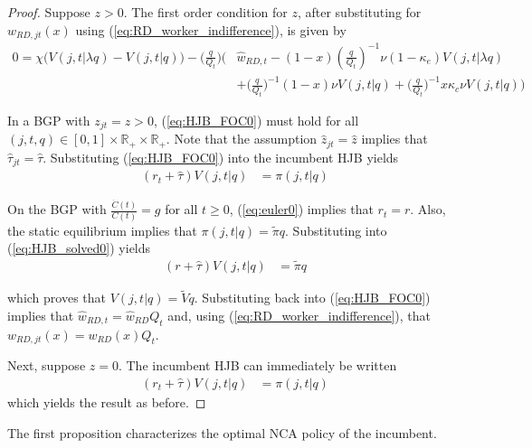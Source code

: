 \documentclass[11pt,english]{article}
\begin{document}
\begin{proof}
	Suppose $z > 0$. The first order condition for $z$, after substituting for $w_{RD,jt}(x)$ using (\ref{eq:RD_worker_indifference}), is given by 
	\begin{align}
	0 = \chi \big( V(j,t|\lambda q) - V(j,t|q)\big) - \big(\frac{q}{Q_t}\big) \Bigg( &\hat{w}_{RD,t} - (1-x) (\frac{q}{Q_t})^{-1} \nu (1-\kappa_e) V(j,t|\lambda q) \nonumber \\
	&+ \big(\frac{q}{Q_t}\big)^{-1} (1-x) \nu V(j,t|q) + \big(\frac{q}{Q_t}\big)^{-1}  x \kappa_c \nu V(j,t|q) \Bigg) \label{eq:HJB_FOC0}
	\end{align}
	
	In a BGP with $z_{jt} = z > 0$, (\ref{eq:HJB_FOC0}) must hold for all $(j,t,q) \in [0,1] \times \mathbb{R}_+ \times \mathbb{R}_+$. Note that the assumption $\hat{z}_{jt} = \hat{z}$ implies that $\hat{\tau}_{jt} = \hat{\tau}$. Substituting (\ref{eq:HJB_FOC0}) into the incumbent HJB yields
	\begin{align}
	(r_t + \hat{\tau}) V(j,t|q) &= \pi(j,t|q) \label{eq:HJB_solved0}
	\end{align}
	
	On the BGP with $\frac{\dot{C}(t)}{C(t)} = g$ for all $t \ge 0 $, (\ref{eq:euler0}) implies that $r_t = r$. Also, the static equilibrium implies that $\pi(j,t|q) = \tilde{\pi} q$. Substituting into (\ref{eq:HJB_solved0}) yields
	\begin{align}
	(r + \hat{\tau}) V(j,t|q) &= \tilde{\pi}q \label{eq:HJB_solved1}
	\end{align}
	
	which proves that $V(j,t|q) = \tilde{V}q$. Substituting back into (\ref{eq:HJB_FOC0}) implies that $\hat{w}_{RD,t} = \hat{w}_{RD} Q_t$ and, using (\ref{eq:RD_worker_indifference}), that $w_{RD,jt}(x) = w_{RD}(x) Q_t$. 
	
	Next, suppose $z = 0$. The incumbent HJB can immediately be written
	\begin{align*}
		(r_t + \hat{\tau}) V(j,t|q) &= \pi(j,t|q)
	\end{align*}
	which yields the result as before. 
\end{proof}

The first proposition characterizes the optimal NCA policy of the incumbent.
\end{document}

